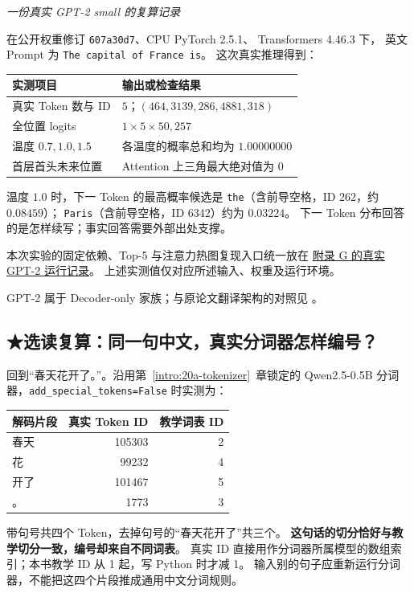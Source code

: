 \begin{example}
\noindent\emph{一份真实 GPT-2 small 的复算记录}\par
在公开权重修订 \texttt{607a30d7}、CPU PyTorch 2.5.1、
Transformers 4.46.3 下，
英文 Prompt 为 \texttt{The capital of France is}。
这次真实推理得到：

\begin{center}\small
{}
\begin{tabularx}{\linewidth}{@{}p{41mm}X@{}}
\toprule
实测项目 & 输出或检查结果\\\midrule
真实 Token 数与 ID & $5$；$(464,3139,286,4881,318)$\\
全位置 logits & $1\times5\times50{,}257$\\
温度 $0.7,1.0,1.5$ & 各温度的概率总和均为 $1.00000000$\\
首层首头未来位置 & Attention 上三角最大绝对值为 $0$\\
\bottomrule
\end{tabularx}
\end{center}

温度 $1.0$ 时，下一 Token 的最高概率候选是
\texttt{the}（含前导空格，ID 262，约 $0.08459$）；
\texttt{Paris}（含前导空格，ID 6342）约为 $0.03224$。
下一 Token 分布回答的是怎样续写；事实回答需要外部出处支撑。


本次实验的固定依赖、Top-5 与注意力热图复现入口统一放在
\hyperref[app:revision-notes]{附录 G 的真实 GPT-2 运行记录}。
上述实测值仅对应所述输入、权重及运行环境。
\end{example}

GPT-2 属于 Decoder-only 家族；与原论文翻译架构的对照见
。

\subsection{\texorpdfstring{{\symboliconfont ★}}{★}选读复算：同一句中文，真实分词器怎样编号？}
\label{experiment:real-chinese-tokenizer}

回到“春天花开了。”。沿用第~\ref*{intro:20a-tokenizer}~章锁定的
Qwen2.5-0.5B 分词器，\texttt{add\_special\_tokens=False} 时实测为：
\begin{center}
\begin{tabular}{lrr}
\toprule
解码片段 & 真实 Token ID & 教学词表 ID\\\midrule
春天 & 105303 & 2\\
花 & 99232 & 4\\
开了 & 101467 & 5\\
。 & 1773 & 3\\
\bottomrule
\end{tabular}
\end{center}
带句号共四个 Token，去掉句号的“春天花开了”共三个。
\textbf{这句话的切分恰好与教学切分一致，编号却来自不同词表}。
真实 ID 直接用作分词器所属模型的数组索引；本书教学 ID 从 1 起，写 Python 时才减 1。
输入别的句子应重新运行分词器，不能把这四个片段推成通用中文分词规则。

